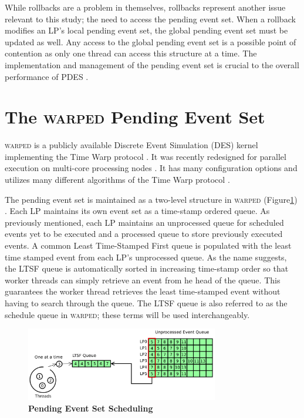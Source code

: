 \documentclass[11pt]{book}
\begin{document}
While rollbacks are a problem in themselves, rollbacks represent another issue relevant to
this study; the need to access the pending event set.  When a rollback modifies an LP's
local pending event set, the global pending event set must be updated as well.  Any access
to the global pending event set is a possible point of contention as only one thread can
access this structure at a time.  The implementation and management of the pending event
set is crucial to the overall performance of PDES \cite{twpes}.

\section{The \textsc{warped} Pending Event Set}

\textsc{warped} is a publicly available Discrete Event Simulation (DES) kernel
implementing the Time Warp protocol \cite{martin,fujimoto}.  It was recently redesigned
for parallel execution on multi-core processing nodes \cite{muthalagu}.  It has many
configuration options and utilizes many different algorithms of the Time Warp protocol
\cite{fujimoto}.

The pending event set is maintained as a two-level structure in \textsc{warped}
(Figure\ref{fig:singleLTSFqueue}) \cite{dickman}.  Each LP maintains its own event set as
a time-stamp ordered queue.  As previously mentioned, each LP maintains an unprocessed
queue for scheduled events yet to be executed and a processed queue to store previously
executed events.  A common Least Time-Stamped First queue is populated with the least time
stamped event from each LP's unprocessed queue.  As the name suggests, the LTSF queue is
automatically sorted in increasing time-stamp order so that worker threads can simply
retrieve an event from he head of the queue.  This guarantees the worker thread retrieves
the least time-stamped event without having to search through the queue. The LTSF queue is
also referred to as the schedule queue in \textsc{warped}; these terms will be used
interchangeably.  

\begin{figure}
    \centering
    \graphicspath{ {./figures/} }
    \includegraphics[width=0.75\textwidth,keepaspectratio]{single_ltsf_queue}
    \caption{\textbf{Pending Event Set Scheduling}}\label{fig:singleLTSFqueue}
\end{figure}
\end{document}
